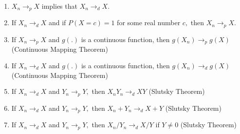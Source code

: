 \documentclass[notes=show]{beamer}
\begin{document}
\begin{frame}%


\begin{enumerate}
\item $X_{n}\rightarrow _{p}X$ implies that $X_{n}\rightarrow _{d}X.$

\item If $X_{n}\rightarrow _{d}X$ and if $P(X=c)=1$ for some real number $c,$
then $X_{n}\rightarrow _{p}X.$

\item If $X_{n}\rightarrow _{p}X$ and $g(.)$ is a continuous function, then $%
g(X_{n})\rightarrow _{p}g(X)$ (Continuous Mapping Theorem)

\item If $X_{n}\rightarrow _{d}X$ and $g(.)$ is a continuous function, then $%
g(X_{n})\rightarrow _{d}g(X)$ (Continuous Mapping Theorem)

\item If $X_{n}\rightarrow _{d}X$ and $Y_{n}\rightarrow _{p}Y,$ then $%
X_{n}Y_{n}\rightarrow _{d}XY$ (Slutsky Theorem)

\item If $X_{n}\rightarrow _{d}X$ and $Y_{n}\rightarrow _{p}Y,$ then $%
X_{n}+Y_{n}\rightarrow _{d}X+Y$ (Slutsky Theorem)

\item If $X_{n}\rightarrow _{d}X$ and $Y_{n}\rightarrow _{p}Y,$ then $%
X_{n}/Y_{n}\rightarrow _{d}X/Y$ if $Y\neq 0$ (Slutsky Theorem)
\end{enumerate}

\end{frame}%
\end{document}
